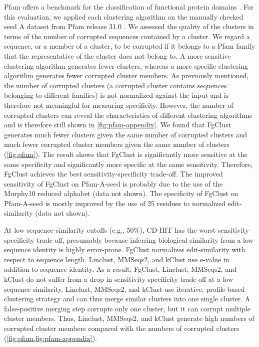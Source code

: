\documentclass[11pt,letterpaper]{article}
\begin{document}
Pfam offers a benchmark for the classification of functional protein domains \citep{finn2016pfam}.
For this evaluation, we applied each clustering algorithm on
the manually checked seed A dataset from Pfam release 31.0 \citep{finn2016pfam}.
We assessed the quality of the clusters in terms of 
the number of corrupted sequences contained by a cluster.
We regard a sequence, or a member of a cluster, to be corrupted if it belongs to a Pfam family that the representative of the cluster does not belong to.
A more sensitive clustering algorithm generates fewer clusters, whereas a more specific clustering algorithm generates fewer corrupted cluster members.
As previously mentioned, 
the number of corrupted clusters (a corrupted cluster contains sequences belonging to different families) is not normalized against the input and is therefore not meaningful for measuring specificity.
However, the number of corrupted clusters can reveal the characteristics of different clustering algorithms and is therefore still shown in \cref{fig:pfam-appendix}.
We found that FgClust generates much fewer clusters given the same number of corrupted clusters and much fewer corrupted cluster members given the same number of clusters (\cref{fig:pfam}).
The result shows that FgClust is significantly more sensitive at the same specificity and significantly more specific at the same sensitivity.
Therefore, FgClust achieves the best sensitivity-specificity trade-off.
The improved sensitivity of FgClust on Pfam-A-seed is probably due to the use of the Murphy10 reduced alphabet (data not shown).
The specificity of FgClust on Pfam-A-seed is mostly improved by the use of 25 residues to normalized edit-similarity (data not shown). 

At low sequence-similarity cutoffs (e.g., 50\%),
CD-HIT has the worst sensitivity-specificity trade-off, presumably because inferring biological similarity from a low sequence identity is highly error-prone.
FgClust normalizes edit-similarity with respect to sequence length.
Linclust, MMSeqs2, and kClust use e-value in addition to sequence identity.
As a result, FgClust, Linclust, MMSeqs2, and kClust do not suffer from a drop in sensitivity-specificity trade-off at a low sequence similarity.
Linclust, MMSeqs2, and kClust use iterative, profile-based clustering strategy and can thus merge similar clusters into one single cluster.
A false-positive merging step corrupts only one cluster, but it can corrupt multiple cluster members.
Thus, Linclust, MMSeqs2, and kClust generate high numbers of corrupted cluster members compared with the numbers of corrupted clusters (\cref{fig:pfam,fig:pfam-appendix}).
\end{document}
